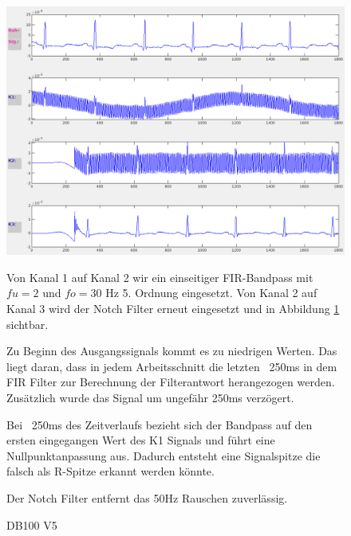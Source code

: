 \documentclass[a4paper,12pt,titlepage]{scrartcl}
\begin{document}
\begin{figure}[ht]
    \begin{minipage}[t]{0.5\linewidth}
        \centering
        \includegraphics[width=0.9\linewidth, valign=t]{Assets/LaborBMT-15-50-45.png}
        \caption{DB100 V5}
        \label{db100v5}
    \end{minipage}%
    \begin{minipage}[t]{0.5\linewidth}
        Von Kanal 1 auf Kanal 2 wir ein einseitiger FIR-Bandpass mit $fu=2$ und $fo=30$ Hz 5. Ordnung eingesetzt.
        Von Kanal 2 auf Kanal 3 wird der Notch Filter erneut eingesetzt und in Abbildung \ref{db100v5} sichtbar.

        Zu Beginn des Ausgangssignals kommt es zu niedrigen Werten. Das liegt daran, dass in jedem Arbeitsschnitt die letzten ~250ms in dem FIR Filter zur Berechnung der Filterantwort herangezogen werden.
        Zusätzlich wurde das Signal um ungefähr 250ms verzögert.

        Bei ~250ms des Zeitverlaufs bezieht sich der Bandpass auf den ersten eingegangen Wert des K1 Signals und führt eine Nullpunktanpassung aus. Dadurch entsteht eine Signalspitze die falsch als R-Spitze erkannt werden könnte.

        Der Notch Filter entfernt das 50Hz Rauschen zuverlässig.
    \end{minipage}
\end{figure}
\end{document}
